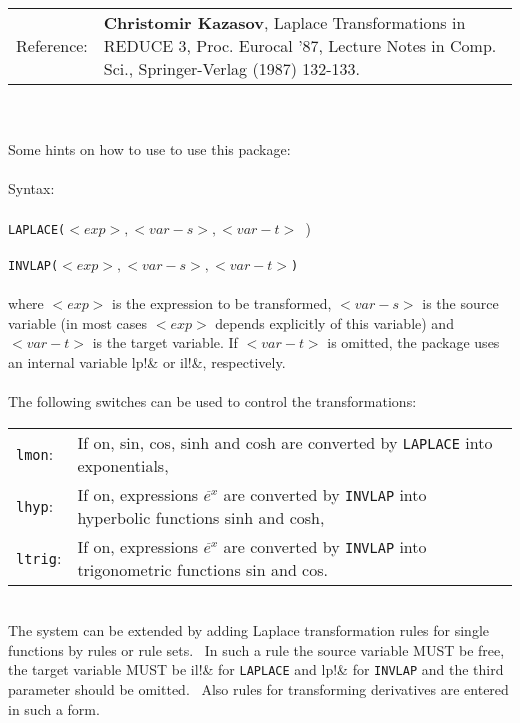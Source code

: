
\begin{center}
\begin{tabular}{lp{10cm}}
Reference: & {\bf Christomir Kazasov}, Laplace Transformations in REDUCE 3, Proc.
Eurocal '87, Lecture Notes in Comp. Sci., Springer-Verlag
(1987) 132-133.
\end{tabular} 
\end{center}
\ \\
\ \\
Some hints on how to use to use this package: \\
\ \\
Syntax: \\
\ \\
{\tt LAPLACE($<exp>,<var-s>,<var-t>$ }) \\
\ \\
{\tt INVLAP($<exp>,<var-s>,<var-t>$)} \\
\ \\
where $<exp>$ is the expression to be transformed, $<var-s>$ is the source
variable (in most cases $<exp>$ depends explicitly of this variable) and
$<var-t>$ is the target variable. If $<var-t>$ is omitted, the package uses
an internal variable lp!\& or il!\&, respectively. \\
\ \\
The following switches can be used to control the transformations: \\
\begin{center}
\begin{tabular}{lp{10cm}}
{\tt lmon}: & If on, sin, cos, sinh and cosh are converted by {\tt LAPLACE} into
exponentials, \\
{\tt lhyp}: & If on, expressions $e^{\tilde{}x}$ are converted by {\tt INVLAP} into 
hyperbolic functions sinh and cosh, \\
{\tt ltrig}: & If on, expressions $e^{\tilde{}x}$ are converted by {\tt INVLAP} into
trigonometric functions sin and cos. \\
\end{tabular} 
\end{center}
\ \\
The system can be extended by adding Laplace transformation rules for
single functions by rules or rule sets.~ In such a rule the source
variable MUST be free, the target variable MUST be il!\& for {\tt LAPLACE} and
lp!\& for {\tt INVLAP} and the third parameter should be omitted.~ Also rules for
transforming derivatives are entered in such a form. \\

